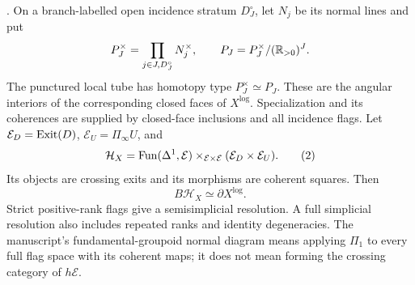 \begin{theorem}\label{P1a2}
.
On a branch-labelled open incidence stratum $D_J^\circ$, let $N_j$
be its normal lines and put
\[
 P_J^\times=\prod_{j\in J,D_J^\circ}N_j^\times,\qquad
 P_J=P_J^\times/(\mathbb R_{>0})^J .
\]
The punctured local tube has homotopy type $P_J^\times\simeq P_J$.
These are the angular interiors of the corresponding closed faces
of $X^{\log}$. Specialization and its coherences are supplied by
closed-face inclusions and all incidence flags.
Let $\mathcal E_D=\operatorname{Exit}(D)$, $\mathcal E_U=\Pi_\infty U$, and
\[
 \mathcal H_X=\operatorname{Fun}(\Delta^1,\mathcal E)
 \times_{\mathcal E\times\mathcal E}
             (\mathcal E_D\times\mathcal E_U). \tag{2}
\]
Its objects are crossing exits and its morphisms are coherent squares.
Then
\[
                  B\mathcal H_X\simeq\partial X^{\log}. \tag{3}
\]
Strict positive-rank flags give a semisimplicial resolution. A full
simplicial resolution also includes repeated ranks and identity
degeneracies. The manuscript's fundamental-groupoid normal diagram
means applying $\Pi_1$ to every full flag space with its coherent
maps; it does not mean forming the crossing category of $h\mathcal E$.
\end{theorem}

